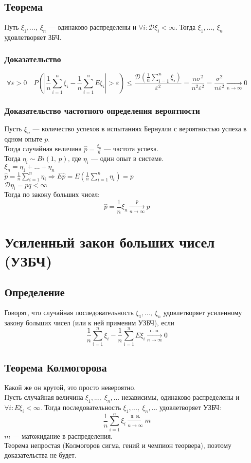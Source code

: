 \documentclass[12pt, a4paper]{article}
\begin{document}
    \subsection*{Теорема}
    Путь $\xi_1,\dots,\ \xi_n$ --- одинаково распределены и $\forall i: \mathcal{D}\xi_i < \infty$. Тогда $\xi_1,\dots,\ \xi_n$ удовлетворяет ЗБЧ.
    \subsubsection*{Доказательство}
    \[\forall \varepsilon > 0\quad P\left(\left| \frac{1}{n}\sum_{i = 1}^{n}\xi_i - \frac{1}{n} \sum_{i = 1}^{n} E\xi_i \right| > \varepsilon\right) \leq \frac{\mathcal{D}\left( \frac{1}{n} \sum_{i = 1}^{n}\xi_i \right)}{\varepsilon^2} = \frac{n\sigma^2}{n^2 \varepsilon^2} = \frac{\sigma^2}{n\varepsilon^2} \xrightarrow[n\to\infty]{} 0\]
    \subsubsection*{Доказательство частотного определения вероятности}
    Пусть $\xi_n$ --- количество успехов в испытаниях Бернулли с вероятностью успеха в одном опыте $p$.\\
    Тогда случайная величина $\hat{p} = \frac{\xi_n}{n}$ --- частота успеха.\\
    Тогда $\eta_i \sim Bi(1,\ p)$, где $\eta_i$ --- один опыт в системе.\\
    $\xi_n = \eta_1 + \dots + \eta_n$\\
    $\hat{p} = \frac{1}{n} \sum_{i = 1}^{n} \eta_i\Rightarrow E\hat{p} = E\left( \frac{1}{n} \sum_{i = 1}^{n} \eta_i \right) = p$\\
    $\mathcal{D}\eta_i = pq < \infty$\\
    Тогда по закону больших чисел:
    \[\hat{p} = \frac{1}{n} \xi_n \xrightarrow[n\to \infty]{p} p\]
    \section*{Усиленный закон больших чисел (УЗБЧ)}
    \subsection*{Определение}
    Говорят, что случайная последовательность $\xi_1,\dots,\ \xi_n$ удовлетворяет усиленному закону больших чисел (или к ней применим УЗБЧ), если
    \[\frac{1}{n}\sum_{i=1}^{n} \xi_i - \frac{1}{n}\sum_{i = 1}^{n} E\xi_i \xrightarrow[n\to\infty]{\text{п. н.}} 0\]
    \subsection*{Теорема Колмогорова}
    Какой же он крутой, это просто невероятно.\\
    Пусть случайная величина $\xi_1,\dots,\ \xi_n,\dots$ независимы, одинаково распределены и $\forall i: E\xi_i < \infty$. Тогда последовательность $\xi_1,\dots,\ \xi_n,\dots$ удовлетворяет УЗБЧ:
    \[\frac{1}{n}\sum_{i = 1}^{n} \xi_i \xrightarrow[n\to \infty]{\text{п. н.}} m\]
    $m$ --- матожидание в распределения.\\
    Теорема непростая (Колмогоров сигма, гений и чемпион теорвера), поэтому доказательства не будет.
\end{document}

